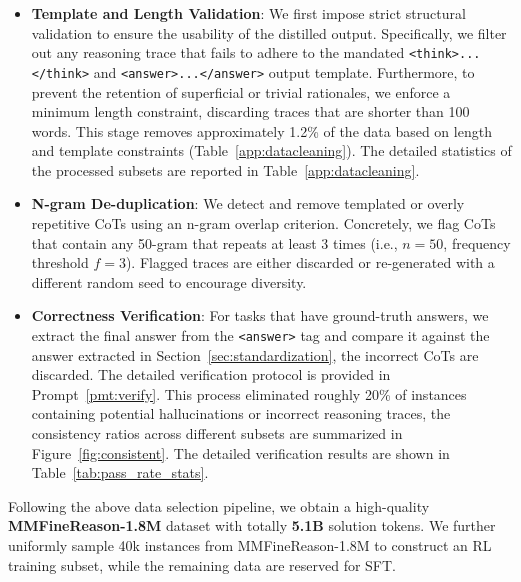 \begin{itemize}
    \item \textbf{Template and Length Validation}: We first impose strict structural validation to ensure the usability of the distilled output. Specifically, we filter out any reasoning trace that fails to adhere to the mandated \verb|<think>...</think>| and \verb|<answer>...</answer>| output template. Furthermore, to prevent the retention of superficial or trivial rationales, we enforce a minimum length constraint, discarding traces that are shorter than 100 words. This stage removes approximately 1.2\% of the data based on length and template constraints (Table~\ref{app:datacleaning}). The detailed statistics of the processed subsets are reported in Table~\ref{app:datacleaning}.
    \item \textbf{N-gram De-duplication}: We detect and remove templated or overly repetitive CoTs using an n-gram overlap criterion. Concretely, we flag CoTs that contain any 50-gram that repeats at least 3 times (i.e., $n=50$, frequency threshold $f=3$). Flagged traces are either discarded or re-generated with a different random seed to encourage diversity.
    \item \textbf{Correctness Verification}: For tasks that have ground-truth answers, we extract the final answer from the \verb|<answer>| tag and compare it against the answer extracted in Section~\ref{sec:standardization}, the incorrect CoTs are discarded. The detailed verification protocol is provided in Prompt~\ref{pmt:verify}. This process eliminated roughly 20\% of instances containing potential hallucinations or incorrect reasoning traces, the consistency ratios across different subsets are summarized in Figure~\ref{fig:consistent}. The detailed verification results are shown in Table~\ref{tab:pass_rate_stats}.
\end{itemize}

Following the above data selection pipeline, we obtain a high-quality \textbf{MMFineReason-1.8M} dataset with totally \textbf{5.1B} solution tokens. 
We further uniformly sample 40k instances from MMFineReason-1.8M to construct an RL training subset, while the remaining data are reserved for SFT.




